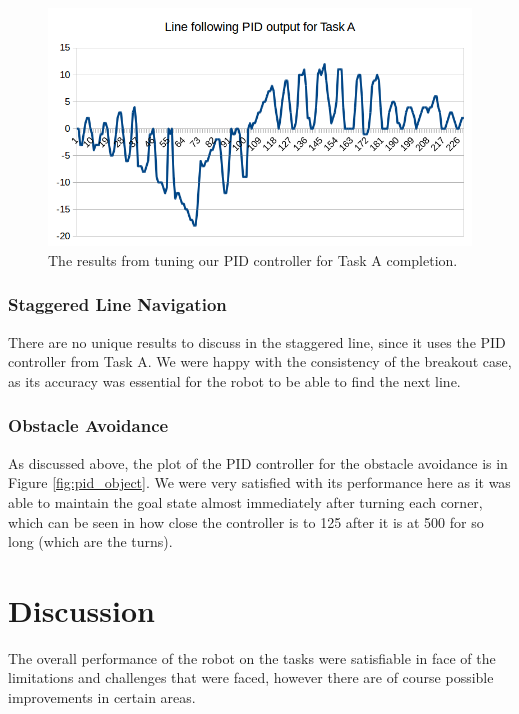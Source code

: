 \documentclass[12pt]{article}
\begin{document}
\begin{figure}
	\includegraphics[width=\linewidth]{pid_taskA}
	\caption{The results from tuning our PID controller for Task A completion.}
	\label{fig:taskA_plot}
\end{figure}

\subsubsection{Staggered Line Navigation}

There are no unique results to discuss in the staggered line, since it uses the PID controller from Task A. We were happy with the consistency of the breakout case, as its accuracy was essential for the robot to be able to find the next line.

\subsubsection{Obstacle Avoidance}

As discussed above, the plot of the PID controller for the obstacle avoidance is in Figure \ref{fig:pid_object}. We were very satisfied with its performance here as it was able to maintain the goal state almost immediately after turning each corner, which can be seen in how close the controller is to 125 after it is at 500 for so long (which are the turns).

\section{Discussion}

The overall performance of the robot on the tasks were satisfiable in face of the limitations and challenges that were faced, however there are of course possible improvements in certain areas. 
\end{document}
